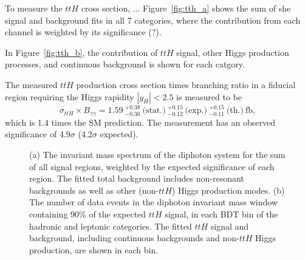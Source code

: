 \documentclass{moriond}
\begin{document}
To measure the $ttH$ cross section, ...
Figure~\ref{fig:tth_a} shows the sum of she signal and background fits in all 7 categories, where
the contribution from each channel is weighted by its significance (?).

In Figure~\ref{fig:tth_b}, the contribution of $ttH$ signal, other Higgs
production processes, and continuous background is shown for each catgory.

The measured $ttH$ production cross section times branching ratio in a fiducial region requiring the
Higgs rapidity $|y_H|<2.5$ is measured to be
%
\begin{equation}
\sigma_{ttH} \times B_{\gamma\gamma} = 1.59~^{+0.38}_{-0.36} ~\textrm{(stat.)}
~^{+0.15}_{-0.12} ~\textrm{(exp.)}
~^{+0.15}_{-0.11} ~\textrm{(th.)}~\textrm{fb},
\end{equation}
%
which is 1.4 times the SM prediction.
The measurement has an observed significance of 4.9$\sigma$ (4.2$\sigma$ expected).

\begin{figure}[!htbp]
  \centering
  \caption{
    (a) The invariant mass spectrum of the diphoton system for the sum of all signal regions, weighted
    by the expected significance of each region. The fitted total background includes non-resonant
    backgrounds as well as other (non-$ttH$) Higgs production modes.
    (b) The number of data events in the diphoton invariant mass window containing 90\% of the expected
    $ttH$ signal, in each BDT bin of the hadronic and leptonic categories.
    The fitted $ttH$ signal and background, including continuous backgrounds and non-$ttH$ Higgs
    production, are shown in each bin.
  }
  \label{fig:tth}
\end{figure}
\end{document}

